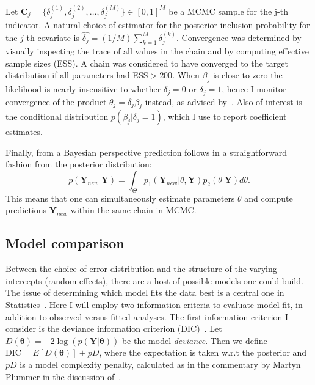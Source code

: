 Let $\mathbf{C}_j = \{ \delta_j^{(1)}, \delta_j^{(2)}, \ldots, \delta_j^{(M)} \} \in [0, 1]^M$ be a MCMC sample for the j-th indicator.
A natural choice of estimator for the posterior inclusion probability for the $j$-th covariate is $\hat{\delta_j} = (1/M)\sum_{k=1}^M \delta_j^{(k)}$.
Convergence was determined by visually inspecting the trace of all values in the chain and by computing effective sample sizes (ESS).
A chain was considered to have converged to the target distribution if all parameters had ESS$>200$.
When $\beta_j$ is close to zero the likelihood is nearly insensitive to whether $\delta_j = 0$ or $\delta_j = 1$, hence I monitor convergence of the product $\theta_j = \delta_j\beta_j$ instead, as advised by~\cite{OHara2009}.
Also of interest is the conditional distribution $p(\beta_j | \delta_j = 1)$, which I use to report coefficient estimates. 

Finally, from a Bayesian perspective prediction follows in a straightforward fashion from the posterior distribution:
\[ p(\boldsymbol Y_{new}  | \boldsymbol Y) = \int_{\Theta} p_1(\boldsymbol Y_{new} | \theta, \boldsymbol Y) p_2(\theta | \boldsymbol Y) d\theta.   \]
This means that one can simultaneously estimate parameters $\theta$  and compute predictions $\boldsymbol Y_{new}$ within the same chain in MCMC.

\subsection{Model comparison}
\label{sec:modcomp}

Between the choice of error distribution and the structure of the varying intercepts (random effects), there are a host of possible models one could build.
The issue of determining which model fits the data best is a central one in Statistics~\citep{Kass1995,Vehtari2017}.
Here I will employ two information criteria to evaluate model fit, in addition to observed-versus-fitted analyses.
The first information criterion I consider is the deviance information criterion (DIC)~\citep{Spiegelhalter2002}.
Let $D(\boldsymbol\theta) = -2 \log(p(\boldsymbol Y | \boldsymbol\theta))$ be the model \textit{deviance}.
Then we define $\text{DIC} = E[D(\boldsymbol\theta)] + pD$, where the expectation is taken w.r.t the posterior and $pD$ is a model complexity penalty, calculated as in the commentary by Martyn Plummer in the discussion of~\cite{Spiegelhalter2002}.


